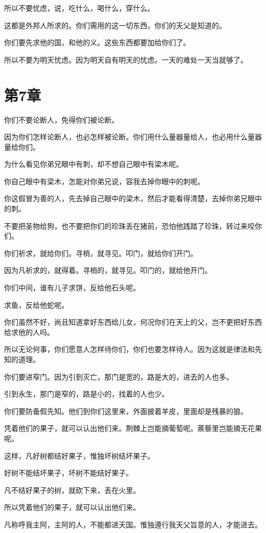 \documentclass[12pt,oneside]{book}
\begin{document}
所以不要忧虑，说，吃什么，喝什么，穿什么。

这都是外邦人所求的。你们需用的这一切东西，你们的天父是知道的。

你们要先求他的国，和他的义。这些东西都要加给你们了。

所以不要为明天忧虑。因为明天自有明天的忧虑。一天的难处一天当就够了。

\chapter{第7章}
你们不要论断人，免得你们被论断。

因为你们怎样论断人，也必怎样被论断。你们用什么量器量给人，也必用什么量器量给你们。

为什么看见你弟兄眼中有刺，却不想自己眼中有梁木呢。

你自己眼中有梁木，怎能对你弟兄说，容我去掉你眼中的刺呢。

你这假冒为善的人，先去掉自己眼中的梁木，然后才能看得清楚，去掉你弟兄眼中的刺。

不要把圣物给狗，也不要把你们的珍珠丢在猪前，恐怕他践踏了珍珠，转过来咬你们。

你们祈求，就给你们。寻梢，就寻见。叩门，就给你们开门。

因为凡祈求的，就得着。寻梢的，就寻见。叩门的，就给他开门。

你们中间，谁有儿子求饼，反给他石头呢。

求鱼，反给他蛇呢。

你们虽然不好，尚且知道拿好东西给儿女，何况你们在天上的父，岂不更把好东西给求他的人吗。

所以无论何事，你们愿意人怎样待你们，你们也要怎样待人。因为这就是律法和先知的道理。

你们要进窄门。因为引到灭亡，那门是宽的，路是大的，进去的人也多。

引到永生，那门是窄的，路是小的，找着的人也少。

你们要防备假先知。他们到你们这里来，外面披着羊皮，里面却是残暴的狼。

凭着他们的果子，就可以认出他们来。荆棘上岂能摘葡萄呢。蒺藜里岂能摘无花果呢。

这样，凡好树都结好果子，惟独坏树结坏果子。

好树不能结坏果子，坏树不能结好果子。

凡不结好果子的树，就砍下来，丢在火里。

所以凭着他们的果子，就可以认出他们来。

凡称呼我主阿，主阿的人，不能都进天国。惟独遵行我天父旨意的人，才能进去。
\end{document}
